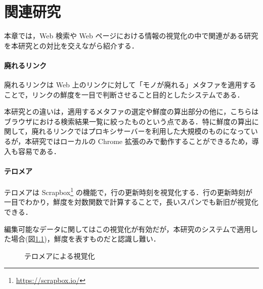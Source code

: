 \chapter{関連研究}
\label{chap:survey}

本章では，Web 検索や Web ページにおける情報の視覚化の中で関連がある研究を本研究との対比を交えながら紹介する．

\newpage

\subsubsection{廃れるリンク}

廃れるリンク\cite{dyinglink}は Web 上のリンクに対して「モノが廃れる」メタファを適用することで，リンクの鮮度を一目で判断させること目的としたシステムである．

本研究との違いは，適用するメタファの選定や鮮度の算出部分の他に，こちらはブラウザにおける検索結果一覧に絞ったものという点である．特に鮮度の算出に関して，廃れるリンクではプロキシサーバーを利用した大規模のものになっているが，本研究ではローカルの Chrome 拡張のみで動作することができるため，導入も容易である．

\subsubsection{テロメア}

テロメア\cite{telomere}は Scrapbox\footnote{\url{https://scrapbox.io/}} の機能で，行の更新時刻を視覚化する．行の更新時刻が一目でわかり，鮮度を対数関数で計算することで，長いスパンでも新旧が視覚化できる．

編集可能なデータに関してはこの視覚化が有効だが，本研究のシステムで適用した場合(図\ref{fig:ver-telomere})，鮮度を表すものだと認識し難い．

\begin{figure}[htbp]
  \begin{center}
  \end{center}
  \caption{テロメアによる視覚化}
  \label{fig:ver-telomere}
\end{figure}

